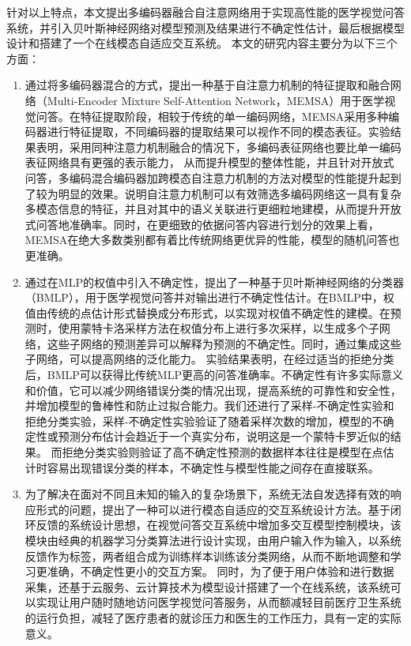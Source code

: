 针对以上特点，本文提出多编码器融合自注意网络用于实现高性能的医学视觉问答系统，并引入贝叶斯神经网络对模型预测及结果进行不确定性估计，最后根据模型设计和搭建了一个在线模态自适应交互系统。
本文的研究内容主要分为以下三个方面：
\begin{enumerate}[topsep = 0 pt, itemsep= 0 pt, parsep=0pt, partopsep=0pt, leftmargin=44pt, itemindent=0pt, labelsep=6pt, label=(\arabic*)]
    \item 通过将多编码器混合的方式，提出一种基于自注意力机制的特征提取和融合网络（Multi-Encoder Mixture Self-Attention Network，MEMSA）用于医学视觉问答。在特征提取阶段，相较于传统的单一编码网络，MEMSA采用多种编码器进行特征提取，不同编码器的提取结果可以视作不同的模态表征。实验结果表明，采用同种注意力机制融合的情况下，多编码表征网络也要比单一编码表征网络具有更强的表示能力，
    从而提升模型的整体性能，并且针对开放式问答，多编码混合编码器加跨模态自注意力机制的方法对模型的性能提升起到了较为明显的效果。说明自注意力机制可以有效筛选多编码网络这一具有复杂多模态信息的特征，并且对其中的语义关联进行更细粒地建模，从而提升开放式问答地准确率。同时，在更细致的依据问答内容进行划分的效果上看，MEMSA在绝大多数类别都有着比传统网络更优异的性能，模型的随机问答也更准确。
    \item 通过在MLP的权值中引入不确定性，提出了一种基于贝叶斯神经网络的分类器（BMLP），用于医学视觉问答并对输出进行不确定性估计。在BMLP中，权值由传统的点估计形式替换成分布形式，以实现对权值不确定性的建模。在预测时，使用蒙特卡洛采样方法在权值分布上进行多次采样，以生成多个子网络，这些子网络的预测差异可以解释为预测的不确定性。同时，通过集成这些子网络，可以提高网络的泛化能力。
    实验结果表明，在经过适当的拒绝分类后，BMLP可以获得比传统MLP更高的问答准确率。不确定性有许多实际意义和价值，它可以减少网络错误分类的情况出现，提高系统的可靠性和安全性，并增加模型的鲁棒性和防止过拟合能力。我们还进行了采样-不确定性实验和拒绝分类实验，采样-不确定性实验验证了随着采样次数的增加，模型的不确定性或预测分布估计会趋近于一个真实分布，说明这是一个蒙特卡罗近似的结果。
    而拒绝分类实验则验证了高不确定性预测的数据样本往往是模型在点估计时容易出现错误分类的样本，不确定性与模型性能之间存在直接联系。
    \item 为了解决在面对不同且未知的输入的复杂场景下，系统无法自发选择有效的响应形式的问题，提出了一种可以进行模态自适应的交互系统设计方法。基于闭环反馈的系统设计思想，在视觉问答交互系统中增加多交互模型控制模块，该模块由经典的机器学习分类算法进行设计实现，由用户输入作为输入，以系统反馈作为标签，两者组合成为训练样本训练该分类网络，从而不断地调整和学习更准确，不确定性更小的交互方案。
    同时，为了便于用户体验和进行数据采集，还基于云服务、云计算技术为模型设计搭建了一个在线系统，该系统可以实现让用户随时随地访问医学视觉问答服务，从而额减轻目前医疗卫生系统的运行负担，减轻了医疗患者的就诊压力和医生的工作压力，具有一定的实际意义。
\end{enumerate}   

